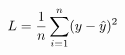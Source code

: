 \documentclass[preview]{standalone}
\begin{document}
\begin{align*}
\special{dvisvgm:raw <g id='unique000'>}L=\frac{1}{n}\sum^{n}_{i=1}(y-\hat{y})^2\special{dvisvgm:raw </g>}
\end{align*}
\end{document}
